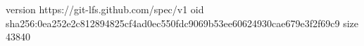 version https://git-lfs.github.com/spec/v1
oid sha256:0ea252e2c812894825cf4ad0ec550fdc9069b53ee60624930cae679e3f2f69c9
size 43840
